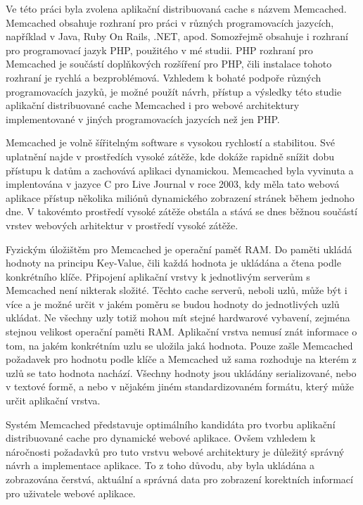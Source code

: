 \documentclass[12pt]{article}
\begin{document}
Ve této práci byla zvolena aplikační distribuovaná cache s názvem Memcached. Memcached obsahuje rozhraní pro práci v různých programovacích jazycích, například v Java, Ruby On Rails, .NET, apod. Somozřejmě obsahuje i rozhraní pro programovací jazyk PHP, použitého v mé studii. PHP rozhraní pro Memcached je součástí doplňkových rozšíření pro PHP, čili instalace tohoto rozhraní je rychlá a bezproblémová. Vzhledem k bohaté podpoře různých programovacích jazyků, je možné použít návrh, přístup a výsledky této studie aplikační distribuované cache Memcached i pro webové architektury implementované v jiných programovacích jazycích než jen PHP.

Memcached je volně šířitelným software s vysokou rychlostí a stabilitou. Své uplatnění najde v prostředích vysoké zátěže, kde dokáže rapidně snížit dobu přístupu k datům a zachovává aplikaci dynamickou. Memcached byla vyvinuta a implentována v jazyce C pro Live Journal v roce 2003, kdy měla tato webová aplikace přístup několika miliónů dynamického zobrazení stránek během jednoho dne. V takovémto prostředí vysoké zátěže obstála a stává se dnes běžnou součástí vrstev webových arhitektur v prostředí vysoké zátěže.

Fyzickým úložištěm pro Memcached je operační paměť RAM. Do paměti ukládá hodnoty na principu Key-Value, čili každá hodnota je ukládána a čtena podle konkrétního klíče. Připojení aplikační vrstvy k jednotlivým serverům s Memcached není nikterak složité. Těchto cache serverů, neboli uzlů, může být i více a je možné určit v jakém poměru se budou hodnoty do jednotlivých uzlů ukládat. Ne všechny uzly totiž mohou mít stejné hardwarové vybavení, zejména stejnou velikost operační paměti RAM. Aplikační vrstva nemusí znát informace o tom, na jakém konkrétním uzlu se uložila jaká hodnota. Pouze zašle Memcached požadavek pro hodnotu podle klíče a Memcached už sama rozhoduje na kterém z uzlů se tato hodnota nachází. Všechny hodnoty jsou ukládány serializované, nebo v textové formě, a nebo v nějakém jiném standardizovaném formátu, který může určit aplikační vrstva.\cite{memcached}

Systém Memcached představuje optimálního kandidáta pro tvorbu aplikační distribuované cache pro dynamické webové aplikace. Ovšem vzhledem k náročnosti požadavků pro tuto vrstvu webové architektury je důležitý správný návrh a implementace aplikace. To z toho důvodu, aby byla ukládána a zobrazována čerstvá, aktuální a správná data pro zobrazení korektních informací pro uživatele webové aplikace.
\end{document}
